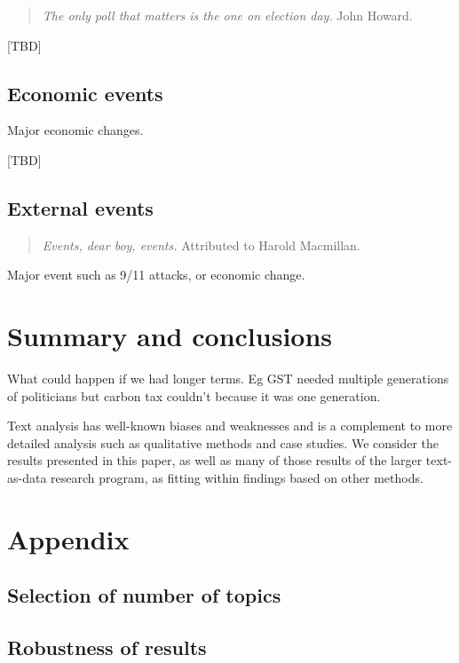 \documentclass[12pt,]{article}
\begin{document}
\begin{quote}
\emph{The only poll that matters is the one on election day.} John
Howard.
\end{quote}

{[}TBD{]}

\subsection{Economic events}\label{economic-events}

Major economic changes.

{[}TBD{]}

\subsection{External events}\label{external-events}

\begin{quote}
\emph{Events, dear boy, events.} Attributed to Harold Macmillan.
\end{quote}

Major event such as 9/11 attacks, or economic change.

\section{Summary and conclusions}\label{summary-and-conclusions}

What could happen if we had longer terms. Eg GST needed multiple
generations of politicians but carbon tax couldn't because it was one
generation.

Text analysis has well-known biases and weaknesses and is a complement
to more detailed analysis such as qualitative methods and case studies.
We consider the results presented in this paper, as well as many of
those results of the larger text-as-data research program, as fitting
within findings based on other methods.

\newpage

\section{Appendix}\label{appendix}

\subsection{Selection of number of
topics}\label{selection-of-number-of-topics}

\subsection{Robustness of results}\label{robustness-of-results}
\end{document}

